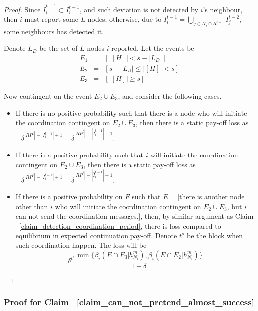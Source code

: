 \documentclass[12pt]{article}
\theoremstyle{remark}
\theoremstyle{remark}
\begin{document}
\begin{proof}


Since $\bar{I}^{t-1}_i\subset I^{t-1}_i$, and such deviation is not detected by $i$'s neighbour, then $i$ must report some $L$-nodes; otherwise, due to $I^{t-1}_i=\bigcup_{j\in N_i\cap R^{t-1}}I^{t-2}_j$, some neighbours has detected it.

Denote $L_D$ be the set of $L$-nodes $i$ reported. Let the events be
\begin{eqnarray*}
E_1 &= & [|[H]|<s-|L_D|]\\
E_2 &= & [s-|L_D|\leq |[H]| < s]\\
E_3 &= & [|[H]| \geq s]
\end{eqnarray*}

Now contingent on the event $E_2\cup E_3$, and consider the following cases.
\begin{itemize}
\item If there is no positive probability such that there is a node who will initiate the coordination contingent on $E_2\cup E_3$, then there is a static pay-off loss as $-\delta^{|RP^t|-|I^{t-1}_i|+1}+\delta^{|RP^t|-|\bar{I}^{t-1}_i|+1}$.
\item If there is a positive probability such that $i$ will initiate the coordination contingent on $E_2\cup E_3$, then there is a static pay-off loss as $-\delta^{|RP^t|-|I^{t-1}_i|+1}+\delta^{|RP^t|-|\bar{I}^{t-1}_i|+1}$.
\item If there is a positive probability on $E$ such that $E=[$there is another node other than $i$ who will initiate the coordination contingent on $E_2\cup E_3$, but $i$ can not send the coordination messages.$]$, then, by similar argument as Claim ~\ref{claim_detection_coordination_period},  there is loss compared to equilibrium in expected continuation pay-off. Denote $t^s$ be the block when such coordination happen. The loss will be 
\[\delta^{t^{s}}\frac{\min\{\beta_{i}(E\cap E_3|h^{m}_{N_i}),\beta_{i}(E\cap E_2|h^{m}_{N_i})\}}{1-\delta}\]



\end{itemize}







\end{proof}




\subsubsection{Proof for Claim ~\ref{claim_can_not_pretend_almost_success}}
\end{document}
